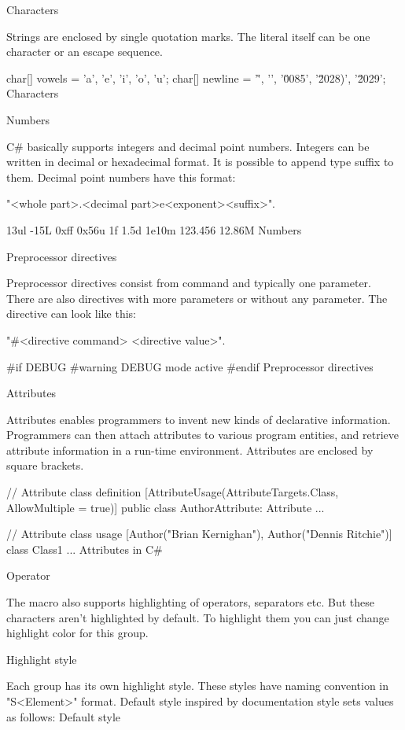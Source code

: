\secc Characters

Strings are enclosed by single quotation marks.
The literal itself can be one character or an escape sequence.

\begtt
char[] vowels = {'a', 'e', 'i', 'o', 'u'};
char[] newline = {'\r', '\n', '\u0085', '\u2028)', '\u2029'};
\endtt
\priklad Characters

\secc Numbers

C\# basically supports integers and decimal point numbers.
Integers can be written in decimal or hexadecimal format.
It is possible to append type suffix to them.
Decimal point numbers have this format:

"<whole part>.<decimal part>e<exponent><suffix>".

         13ul         -15L       0xff         0x56u
    1f         1.5d        1e10m    123.456        12.86M
\endtt
\priklad Numbers

\sec Preprocessor directives

Preprocessor directives consist from command and typically one parameter.
There are also directives with more parameters or without any parameter.
The directive can look like this:

"#<directive command> <directive value>".

\begtt
#if DEBUG
#warning DEBUG mode active
#endif
\endtt
\priklad Preprocessor directives

\sec Attributes

Attributes enables programmers to invent new kinds of declarative information.
Programmers can then attach attributes to various program entities, and retrieve attribute information in a run-time environment.
Attributes are enclosed by square brackets.

\begtt
// Attribute class definition
[AttributeUsage(AttributeTargets.Class, AllowMultiple = true)]
public class AuthorAttribute: Attribute
{ ... }

// Attribute class usage
[Author("Brian Kernighan"), Author("Dennis Ritchie")]
class Class1
{ ... }
\endtt
\priklad Attributes in C\#

\sec Operator

The macro also supports highlighting of operators, separators etc.
But these characters aren't highlighted by default.
To highlight them you can just change highlight color for this group.

\chap Highlight style

Each group has its own highlight style.
These styles have naming convention in "S<Element>" format.
Default style inspired by documentation style sets values as follows:
\midinsert
{}
\begtt
\let\SComment=\Green      %
\let\SDocComment=\Grey    %
\let\SPreprocKW=\Magenta  %
\let\SPreprocVal=\Magenta %
\let\SKeyword=\Blue       %
\let\SAttribute=\Cyan     %
\let\SLiteral=\Cyan       %
\let\SString=\Red         %
\let\SChar=\Red           %
\let\SNumber=\Black       %
\let\SOper=\Black         %
\endtt
\priklad Default style
\endinsert


